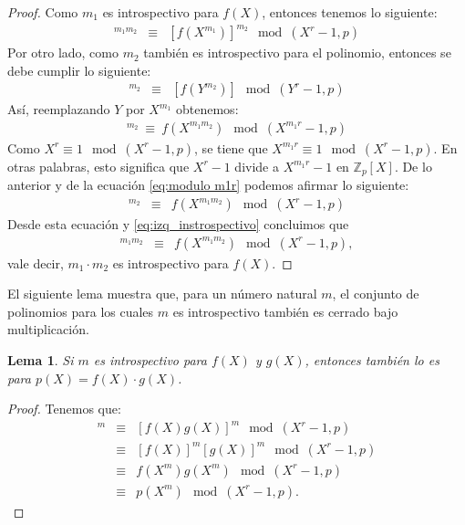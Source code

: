 \documentclass[10pt]{article}
\newcommand{\0}{\mathbf{0}}
\newcommand{\1}{\mathbf{1}}
\newcommand{\divi}{\hspace{1.8pt}|\hspace{1.8pt}}
\newcommand{\modulop}{\mod (X^r-1,p)}
\newcommand{\moduloy}{\!\!\mod (Y^r-1,p)}
\newcommand{\modulomr}{\!\!\mod (X^{m_1r}-1,p)}
\newcommand{\+}{\oplus}
\newtheorem{lemma}[theorem]{Lema}
\theoremstyle{remark}
\theoremstyle{remark}
\begin{document}
	\begin{proof}
Como $m_1$ es introspectivo para $f(X)$, entonces tenemos lo siguiente:
			\begin{eqnarray}
			[f(X)]^{m_1m_2}& \equiv &[f(X^{m_1})]^{m_2}\modulop\label{eq:izq_instrospectivo}
			\end{eqnarray}
Por otro lado, como $m_2$ también es introspectivo para el polinomio,
entonces se debe cumplir lo siguiente:
			\begin{eqnarray*}
				[f(Y)]^{m_2} & \equiv & [f(Y^{m_2})] \moduloy
		        \end{eqnarray*}
Así, reemplazando $Y$ por $X^{m_1}$ obtenemos:                        
			\begin{eqnarray}
		          [f(X^{m_1})]^{m_2}\ \equiv \ f(X^{m_1m_2})\modulomr\label{eq:modulo m1r}
		\end{eqnarray}
		Como $X^{r} \equiv  1\modulop$, se tiene que $X^{m_1r}\equiv 1\modulop$. En otras palabras, esto significa que $X^r -1$ divide a $X^{m_1r}-1$ en $\mathbb{Z}_p[X]$. 
De lo anterior y  de la ecuación \eqref{eq:modulo m1r} podemos afirmar lo siguiente:
\begin{eqnarray*}
  [f(X^{m_1})]^{m_2}&\equiv & f(X^{m_1m_2})\modulop
		\end{eqnarray*}
Desde esta ecuación y \eqref{eq:izq_instrospectivo} concluimos que
\begin{eqnarray*}
  [f(X)]^{m_1m_2} & \equiv & f(X^{m_1m_2})\modulop,
\end{eqnarray*}
vale decir, $m_1\cdot m_2$ es introspectivo para $f(X)$.	
	\end{proof}
	El siguiente lema muestra que, para un número natural $m$, el conjunto de polinomios para los cuales $m$ es introspectivo también es cerrado bajo multiplicación.
	\begin{lemma}\label{lem-introspectivo_bajo mult}
		Si $m$ es introspectivo para $f(X)$ y $g(X)$, entonces también lo es para $p(X) = f(X)\cdot g(X)$.
	\end{lemma}
	\begin{proof}Tenemos que:
		\begin{eqnarray*}
			[p(X)]^m &\equiv & [f(X)g(X)]^m \modulop\\
			&\equiv &[f(X)]^m [g(X)]^m \modulop\\
			&\equiv &f(X^m) g(X^m) \modulop\\
			&\equiv &p(X^m) \modulop.
		\end{eqnarray*}
	\end{proof}
\end{document}
